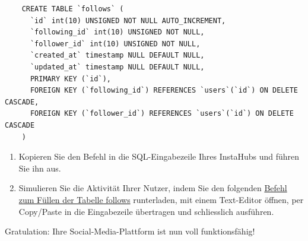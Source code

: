 \begin{myexercise}
  \begin{lstlisting}
    CREATE TABLE `follows` (
      `id` int(10) UNSIGNED NOT NULL AUTO_INCREMENT,
      `following_id` int(10) UNSIGNED NOT NULL,
      `follower_id` int(10) UNSIGNED NOT NULL,
      `created_at` timestamp NULL DEFAULT NULL,
      `updated_at` timestamp NULL DEFAULT NULL,
      PRIMARY KEY (`id`),
      FOREIGN KEY (`following_id`) REFERENCES `users`(`id`) ON DELETE CASCADE,
      FOREIGN KEY (`follower_id`) REFERENCES `users`(`id`) ON DELETE CASCADE
    )
  \end{lstlisting}
  \begin{enumerate}
    \item Kopieren Sie den Befehl in die SQL-Eingabezeile Ihres InstaHubs und führen Sie ihn aus.
    \item Simulieren Sie die Aktivität Ihrer Nutzer, indem Sie den folgenden \href{https://wi-wissen.github.io/instahub-doc-de/sql/follows.sql}{Befehl zum Füllen der Tabelle follows} runterladen, mit einem Text-Editor öffnen, per Copy/Paste in die Eingabezeile übertragen und schliesslich ausführen.
  \end{enumerate}
  Gratulation: Ihre Social-Media-Plattform ist nun voll funktionsfähig!
\end{myexercise}

